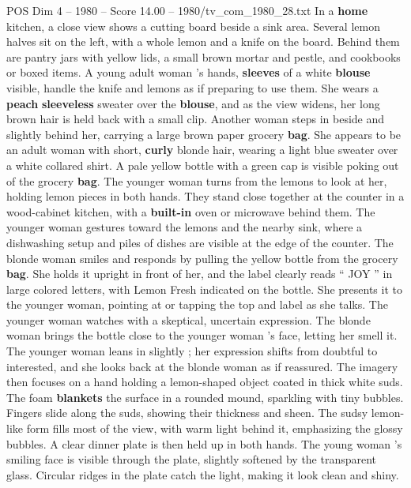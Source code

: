 \begin{textsample}{POS Dim 4 – 1980 – Score 14.00 – 1980/tv\_com\_1980\_28.txt}  \label{ex:f4_pos_045}
In a \textbf{home} kitchen, a close view shows a cutting board beside a sink area.
Several lemon halves sit on the left, with a whole lemon and a knife on the board.
Behind them are pantry jars with yellow lids, a small brown mortar and pestle, and cookbooks or boxed items.
A young adult woman ’s hands, \textbf{sleeves} of a white \textbf{blouse} visible, handle the knife and lemons as if preparing to use them.
She wears a \textbf{peach} \textbf{sleeveless} sweater over the \textbf{blouse}, and as the view widens, her long brown hair is held back with a small clip.
Another woman steps in beside and slightly behind her, carrying a large brown paper grocery \textbf{bag}.
She appears to be an adult woman with short, \textbf{curly} blonde hair, wearing a light blue sweater over a white collared shirt.
A pale yellow bottle with a green cap is visible poking out of the grocery \textbf{bag}.
The younger woman turns from the lemons to look at her, holding lemon pieces in both hands.
They stand close together at the counter in a wood-cabinet kitchen, with a \textbf{built-in} oven or microwave behind them.
The younger woman gestures toward the lemons and the nearby sink, where a dishwashing setup and piles of dishes are visible at the edge of the counter.
The blonde woman smiles and responds by pulling the yellow bottle from the grocery \textbf{bag}.
She holds it upright in front of her, and the label clearly reads “ JOY ” in large colored letters, with Lemon Fresh indicated on the bottle.
She presents it to the younger woman, pointing at or tapping the top and label as she talks.
The younger woman watches with a skeptical, uncertain expression.
The blonde woman brings the bottle close to the younger woman ’s face, letting her smell it.
The younger woman leans in slightly ; her expression shifts from doubtful to interested, and she looks back at the blonde woman as if reassured.
The imagery then focuses on a hand holding a lemon-shaped object coated in thick white suds.
The foam \textbf{blankets} the surface in a rounded mound, sparkling with tiny bubbles.
Fingers slide along the suds, showing their thickness and sheen.
The sudsy lemon-like form fills most of the view, with warm light behind it, emphasizing the glossy bubbles.
A clear dinner plate is then held up in both hands.
The young woman ’s smiling face is visible through the plate, slightly softened by the transparent glass.
Circular ridges in the plate catch the light, making it look clean and shiny.

\end{textsample}
